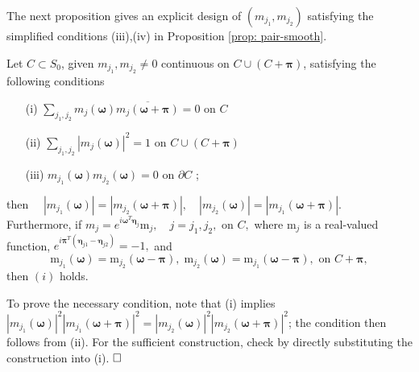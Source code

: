 The next proposition gives an explicit design of $(m_{j_1}, m_{j_2})$ satisfying the simplified conditions (iii),(iv) in Proposition \ref{prop: pair-smooth}. %
\begin{prop}\label{prop: m-design}
Let $C\subset S_0$, given $m_{j_1},m_{j_2}\neq 0$ continuous on $ C\cup(C+\boldsymbol{\pi})$, satisfying the following conditions
\begin{itemize}
\item[(i)] $\sum_{j_1,j_2}m_{j}(\boldsymbol{\omega})\overline{m_{j}(\boldsymbol{\omega}+\boldsymbol{\pi})} = 0$ \hspace*{2em} on $C$
\item[(ii)] $\sum_{j_1,j_2}|m_{j}(\boldsymbol{\omega})|^2= 1 $ \hspace*{5em} on $C\cup (C+\boldsymbol{\pi})$
\item[(iii)] $m_{j_1}(\boldsymbol{\omega})m_{j_2}(\boldsymbol{\omega}) = 0$\hspace*{5em} on $\partial C$ ;
\end{itemize}
then
$\quad|m_{j_1}(\boldsymbol{\omega})| = |m_{j_2}(\boldsymbol{\omega}+\boldsymbol{\pi})|,\quad |m_{j_2}(\boldsymbol{\omega})| = |m_{j_1}(\boldsymbol{\omega}+\boldsymbol{\pi})|.$\\[1mm]
Furthermore, if $m_{j} = e^{i\boldsymbol{\omega}^{T}\boldsymbol{\eta}_{j}}\mathrm{m}_{j},\quad j=j_1,j_2, \text{ on }C,$ where $\mathrm{m}_j$ is a real-valued function, %
$e^{i\boldsymbol{\pi}^T(\boldsymbol{\eta}_{j1}-\boldsymbol{\eta}_{j2})} = -1,$ and 
\[\mathrm{m}_{j_1}(\boldsymbol{\omega}) = \mathrm{m}_{j_2}(\boldsymbol{\omega}-\boldsymbol{\pi}),\;\mathrm{m}_{j_2}(\boldsymbol{\omega}) = \mathrm{m}_{j_1}(\boldsymbol{\omega}-\boldsymbol{\pi}),\text{ on }C+\boldsymbol{\pi},\] 
then $(i)$ holds.
\end{prop}
To prove the necessary condition, note that (i) implies $|m_{j_1}(\boldsymbol{\omega})|^2|m_{j_1}(\boldsymbol{\omega+\pi})|^2 = |m_{j_2}(\boldsymbol{\omega})|^2|m_{j_2}(\boldsymbol{\omega+\pi})|^2$; the condition then follows from (ii).
For the sufficient construction, check by directly substituting the construction into (i). $\hfill\square$

